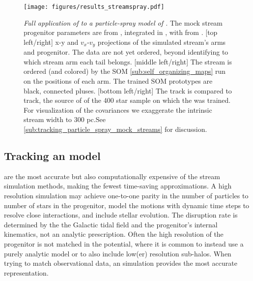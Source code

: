 \documentclass[fleqn,usenatbib]{mnras}
\begin{document}
    \begin{figure*}
      \centering
      \texttt{[image: figures/results\_streamspray.pdf]}
      \caption{
        \emph{Full application of \trackstream{} to a particle-spray model of
        .} The mock stream progenitor parameters are  from \citet{Vasiliev2019}, integrated in \galpyMWPotential{}, with
        \galpystreamspraydf{} from \citep{Bovy2014}.
        [top left/right] x-y and $v_x$-$v_y$ projections of the simulated
        stream's arms and progenitor. The data are not yet ordered, beyond
        identifying to which stream arm each tail belongs.
        [middle left/right] The stream is ordered (and colored) by the SOM
        \autoref{sub:self_organizing_maps} run on the positions of each arm. The
        trained SOM prototypes are black, connected pluses.
        [bottom left/right] The \trackstream{} track is compared to
        \galpystreamspraydf{} track, the source of of the 400 star sample on
        which the \trackstream{} was trained. For visualization of the
        covariances we exaggerate the intrinsic stream width to 300 pc.See
        \autoref{sub:tracking_particle_spray_mock_streams} for discussion. }
      \label{fig:results_streamspray}
    \end{figure*}


  \subsection{Tracking an \nbody{} model}
  \label{sub:tracking_an_n_body_model}

    \nbodys{} are the most accurate but also computationally expensive of the
    stream simulation methods, making the fewest time-saving approximations. A
    high resolution \nbody{} simulation may achieve one-to-one parity in the
    number of particles to number of stars in the progenitor, model the motions
    with dynamic time steps to resolve close interactions, and include stellar
    evolution. The disruption rate is determined by the the Galactic tidal field
    and the progenitor's internal kinematics, not an analytic prescription.
    Often the high resolution of the progenitor is not matched in the potential,
    where it is common to instead use a purely analytic model or to also include
    low(er) resolution sub-halos. When trying to match observational data, an
    \nbody{} simulation provides the most accurate representation.
\end{document}

